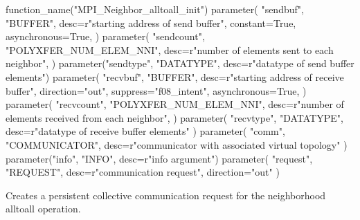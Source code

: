 \begin{mpi-binding}
    function_name("MPI_Neighbor_alltoall_init")
    parameter(
        "sendbuf",
        "BUFFER",
        desc=r"starting address of send buffer",
        constant=True,
        asynchronous=True,
    )
    parameter(
        "sendcount",
        "POLYXFER_NUM_ELEM_NNI",
        desc=r"number of elements sent to each neighbor",
    )
    parameter("sendtype", "DATATYPE", desc=r"datatype of send buffer elements")
    parameter(
        "recvbuf",
        "BUFFER",
        desc=r"starting address of receive buffer",
        direction="out",
        suppress="f08_intent",
        asynchronous=True,
    )
    parameter(
        "recvcount",
        "POLYXFER_NUM_ELEM_NNI",
        desc=r"number of elements received from each neighbor",
    )
    parameter(
        "recvtype", "DATATYPE", desc=r"datatype of receive buffer elements"
    )
    parameter(
        "comm", "COMMUNICATOR", desc=r"communicator with associated virtual topology"
    )
    parameter("info", "INFO", desc=r"info argument")
    parameter(
        "request", "REQUEST", desc=r"communication request", direction="out"
    )
\end{mpi-binding}

Creates a persistent collective communication request for the neighborhood alltoall operation. 

